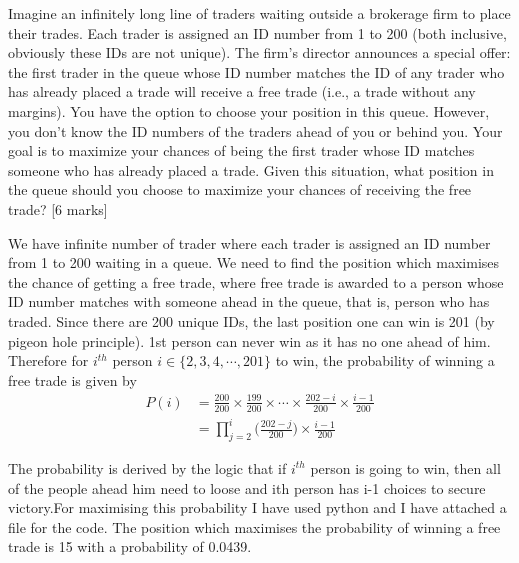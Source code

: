 \begin{que}
	Imagine an infinitely long line of traders waiting outside a brokerage
	firm to place their trades. Each trader is assigned an ID number from 1
	to 200 (both inclusive, obviously these IDs are not unique). The firm’s
	director announces a special offer: the first trader in the queue whose
	ID number matches the ID of any trader who has already placed a trade
	will receive a free trade (i.e., a trade without any margins). You have
	the option to choose your position in this queue.   However, you don’t
	know the ID numbers of the traders ahead of you or behind you. Your
	goal is to maximize your chances of being the first trader whose ID
	matches someone who has already placed a trade. Given this situation,
	what position in the queue should you choose to maximize your chances
	of receiving the free trade?
	\hspace*{\fill} [6 marks]
\end{que}
\begin{tcolorbox}[breakable]
	\begin{sol}
		We have infinite number of trader where each trader is assigned
		an ID number from 1 to 200 waiting in a queue. We need to find
		the position which maximises the chance of getting a free
		trade, where free trade is awarded to a person whose ID number
		matches with someone ahead in the queue, that is, person who
		has traded. Since there are 200 unique IDs, the last position
		one can win is 201 (by pigeon hole principle). 1st person can
		never win as it has no one ahead of him. Therefore for $i^{th}$
		person $i \in \{2,3,4,\cdots,201 \}$ to win, the probability of
		winning a free trade is given by
		\begin{align}
			P(i) & = \frac{200}{200} \times \frac{199}{200} \times \cdots \times \frac{202 - i}{200} \times \frac{i-1}{200} \\
			     & = \prod_{j=2}^{i} \Bigg( \frac{202 - j}{200} \Bigg) \times \frac{i - 1}{200}
		\end{align}

		The probability is derived by the logic that if $i^{th}$ person
  		is going to win, then all of the people ahead him need to loose
    		and ith person has i-1 choices to secure victory.For maximising
      		this probability I have used python and I have attached a file 
		for the code. The position which maximises the probability of 
  		winning a free trade is 15 with a probability of 0.0439.

	\end{sol}
\end{tcolorbox}
